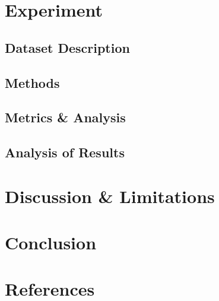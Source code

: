 \section{Experiment} %
\label{sec:experiment}

\subsection{Dataset Description} %
\label{sub:dataset_description}


\subsection{Methods} %
\label{sub:methods}


\subsection{Metrics \& Analysis} %
\label{sub:metrics_&_analysis}


\subsection{Analysis of Results} %
\label{sub:analysis_of_results}



\section{Discussion \& Limitations} %
\label{sec:discussion_&_limitations}


\section{Conclusion} %
\label{sec:conclusion}


\section{References} %
\label{sec:references}

